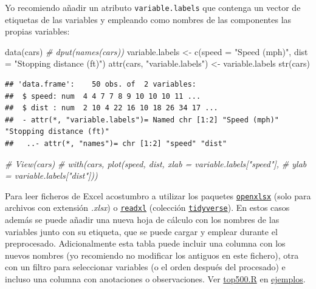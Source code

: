\documentclass[
]{book}
\newenvironment{Shaded}{\begin{snugshade}}{\end{snugshade}}
\newcommand{\AttributeTok}[1]{\textcolor[rgb]{0.77,0.63,0.00}{#1}}
\newcommand{\CommentTok}[1]{\textcolor[rgb]{0.56,0.35,0.01}{\textit{#1}}}
\newcommand{\FunctionTok}[1]{\textcolor[rgb]{0.00,0.00,0.00}{#1}}
\newcommand{\NormalTok}[1]{#1}
\newcommand{\OtherTok}[1]{\textcolor[rgb]{0.56,0.35,0.01}{#1}}
\newcommand{\StringTok}[1]{\textcolor[rgb]{0.31,0.60,0.02}{#1}}
\theoremstyle{break}
\theoremstyle{nonumberplain}
\begin{document}
Yo recomiendo añadir un atributo \texttt{variable.labels} que contenga un vector de etiquetas de las variables y empleando como nombres de las componentes las propias variables:

\begin{Shaded}
\begin{Highlighting}[]
\FunctionTok{data}\NormalTok{(cars)}
\CommentTok{\# dput(names(cars))}
\NormalTok{variable.labels }\OtherTok{\textless{}{-}} \FunctionTok{c}\NormalTok{(}\AttributeTok{speed =} \StringTok{"Speed (mph)"}\NormalTok{, }\AttributeTok{dist =} \StringTok{"Stopping distance (ft)"}\NormalTok{)}
\FunctionTok{attr}\NormalTok{(cars, }\StringTok{"variable.labels"}\NormalTok{) }\OtherTok{\textless{}{-}}\NormalTok{ variable.labels}
\FunctionTok{str}\NormalTok{(cars)}
\end{Highlighting}
\end{Shaded}

\begin{verbatim}
## 'data.frame':    50 obs. of  2 variables:
##  $ speed: num  4 4 7 7 8 9 10 10 10 11 ...
##  $ dist : num  2 10 4 22 16 10 18 26 34 17 ...
##  - attr(*, "variable.labels")= Named chr [1:2] "Speed (mph)" "Stopping distance (ft)"
##   ..- attr(*, "names")= chr [1:2] "speed" "dist"
\end{verbatim}

\begin{Shaded}
\begin{Highlighting}[]
\CommentTok{\# View(cars)}
\CommentTok{\# with(cars, plot(speed, dist, xlab = variable.labels["speed"], }
\CommentTok{\#                 ylab = variable.labels["dist"]))}
\end{Highlighting}
\end{Shaded}

Para leer ficheros de Excel acostumbro a utilizar los paquetes \href{https://cran.r-project.org/web/packages/openxlsx/index.html}{\texttt{openxlsx}} (solo para archivos con extensión \emph{.xlsx}) o \href{https://readxl.tidyverse.org}{\texttt{readxl}} (colección \href{https://www.tidyverse.org/}{\texttt{tidyverse}}).
En estos casos además se puede añadir una nueva hoja de cálculo con los nombres de las variables junto con su etiqueta, que se puede cargar y emplear durante el preprocesado.
Adicionalmente esta tabla puede incluir una columna con los nuevos nombres (yo recomiendo no modificar los antiguos en este fichero), otra con un filtro para seleccionar variables (o el orden después del procesado) e incluso una columna con anotaciones o observaciones.
Ver \href{ejemplos/top500/top500.R}{top500.R} en \href{https://github.com/rubenfcasal/book_notasr/tree/main/ejemplos}{ejemplos}.
\end{document}
